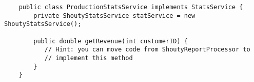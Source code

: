 \begin{verbatim}
    public class ProductionStatsService implements StatsService {
        private ShoutyStatsService statService = new ShoutyStatsService();
    
        public double getRevenue(int customerID) {
           // Hint: you can move code from ShoutyReportProcessor to 
           // implement this method
        }
    }    
\end{verbatim}